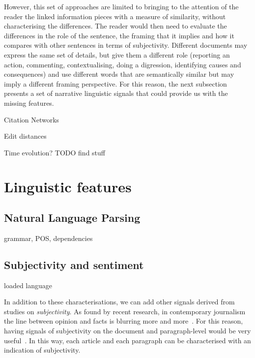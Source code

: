 However, this set of approaches are limited to bringing to the attention of the reader the linked information pieces with a measure of similarity, without characterising the differences. The reader would then need to evaluate the differences in the role of the sentence, the framing that it implies and how it compares with other sentences in terms of subjectivity.
Different documents may express the same set of details, but give them a different role (reporting an action, commenting, contextualising, doing a digression, identifying causes and consequences) and use different words that are semantically similar but may imply a different framing perspective.
For this reason, the next subsection presents a set of narrative linguistic signals that could provide us with the missing features.

Citation Networks

Edit distances

Time evolution? TODO find stuff

\section{Linguistic features}

\subsection{Natural Language Parsing}

grammar, POS, dependencies

\subsection{Subjectivity and sentiment}

loaded language

In addition to these characterisations, we can add other signals derived from studies on \emph{subjectivity}.
As found by recent research, in contemporary journalism the line between opinion and facts is blurring more and more~\cite{blake2019news}. For this reason, having signals of subjectivity on the document and paragraph-level would be very useful~\cite{liu2010sentiment}.
In this way, each article and each paragraph can be characterised with an indication of subjectivity.


